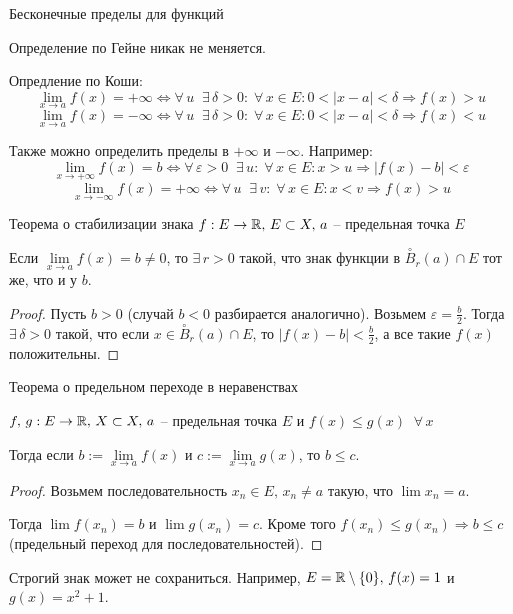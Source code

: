 \begin{conj}
    Бесконечные пределы для функций
\end{conj}
Определение по Гейне никак не меняется. 

Опредление по Коши:
\[ \lim_{x \to a} f(x) = +\infty \Longleftrightarrow \forall \, u \;\; \exists \, \delta > 0 : \; \forall \, x \in E : 0 < |x - a| < \delta \Rightarrow f(x) > u \]
\[ \lim_{x \to a} f(x) = -\infty \Longleftrightarrow \forall \, u \;\; \exists \, \delta > 0 : \; \forall \, x \in E : 0 < |x - a| < \delta \Rightarrow f(x) < u \]

\begin{notice}
    Также можно определить пределы в $+\infty$ и $-\infty$. Например:
    \[ \lim_{x \to +\infty} f(x) = b \Longleftrightarrow \forall \, \varepsilon > 0 \;\; \exists \, u : \; \forall \, x \in E : x > u \Rightarrow |f(x) - b| < \varepsilon   \]
    \[ \lim_{x \to -\infty} f(x) = +\infty \Longleftrightarrow \forall \, u \;\; \exists \, v : \; \forall \, x \in E : x < v \Rightarrow f(x) > u \]
\end{notice}

\vspace{7mm}

\begin{theorem-non}
    Теорема о стабилизации знака
$f : E \to \mathbb{R}, \, E \subset X, \, a$ -- предельная точка $E$

Если $\lim\limits_{x \to a} f(x) = b \neq 0$, то $\exists \, r > 0$ такой, что знак функции в $\overset{\circ}{B}_r(a) \cap E$ тот же, что и у $b$.
\end{theorem-non}
\begin{proof}
    Пусть $b > 0$ (случай $b < 0$ разбирается аналогично). Возьмем $\varepsilon = \frac{b}{2}$. 
    Тогда $\exists \, \delta > 0$ такой, что если $x \in \overset{\circ}{B}_r(a) \cap E$, то $|f(x) - b| < \frac{b}{2}$,
    а все такие $f(x)$ положительны.
\end{proof}

\begin{theorem-non}
    Теорема о предельном переходе в неравенствах

    $f, \, g : E \to \mathbb{R}, \, X \subset X, \, a$ -- предельная точка $E$ и $f(x) \leqslant g(x) \;\; \forall \, x$

    Тогда если $b := \lim\limits_{x \to a} f(x)$ и $c := \lim\limits_{x \to a} g(x)$, то $b \leqslant c$.
\end{theorem-non}
\begin{proof}
    Возьмем последовательность $x_n \in E, \, x_n \neq a$ такую, что $\lim x_n = a$. 

    Тогда $\lim f(x_n) = b$ и $\lim g(x_n) = c$. Кроме того $f(x_n) \leqslant g(x_n) \Rightarrow b \leqslant c$ (предельный переход для последовательностей).
\end{proof}
\begin{notice}
    Строгий знак может не сохраниться. Например, $E = \mathbb{R} \setminus \{0\}, \, f(x) = 1$ и $g(x) = x^2 + 1$.
\end{notice}

